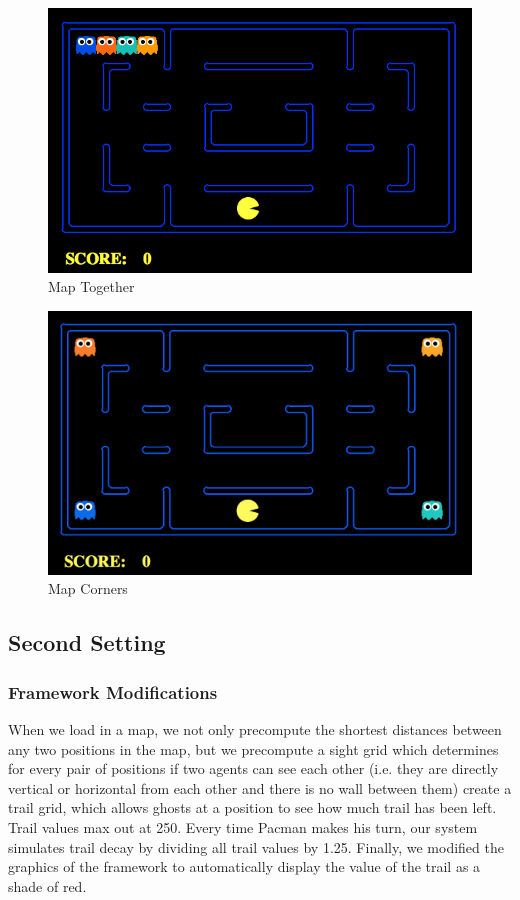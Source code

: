 \documentclass[11pt]{article}
\begin{document}
\begin{multicols}{2}
\begin{figure}[H]
	\includegraphics[width=\columnwidth]{maptogether.png}
	\caption{Map Together}
	\label{fig:maptogether}
\end{figure}

\begin{figure}[H]
	\includegraphics[width=\columnwidth]{mapcorners.png}
	\caption{Map Corners}
	\label{fig:mapcorners}
\end{figure}


\subsection{Second Setting}

\subsubsection{Framework Modifications}
When we load in a map, we not only precompute the shortest distances between any two positions in the map, but we precompute a sight grid which determines for every pair of positions if two agents can see each other (i.e. they are directly vertical or horizontal from each other and there is no wall between them) create a trail grid, which allows ghosts at a position to see how much trail has been left. Trail values max out at 250. Every time Pacman makes his turn, our system simulates trail decay by dividing all trail values by 1.25.  Finally, we modified the graphics of the framework to automatically display the value of the trail as a shade of red.


\end{multicols}
\end{document}
